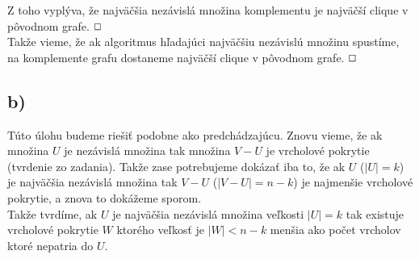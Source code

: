 \documentclass[a4paper]{article}
\begin{document}
Z toho vyplýva, že najväčšia nezávislá množina komplementu je najväčší clique v pôvodnom grafe. $\oblong$
\\

Takže vieme, že ak algoritmus hľadajúci najväčšiu nezávislú množinu spustíme, na komplemente grafu dostaneme najväčší clique v pôvodnom grafe. $\oblong$

\subsection*{b)}

Túto úlohu budeme riešiť podobne ako predchádzajúcu. Znovu vieme, že ak množina $U$ je nezávislá množina tak množina $V-U$ je vrcholové pokrytie (tvrdenie zo zadania). Takže zase potrebujeme dokázať iba to, že ak $U$ ($|U|=k$) je najväčšia nezávislá množina tak $V-U$ ($|V-U|=n-k$) je najmenšie vrcholové pokrytie, a znova to dokážeme sporom.
\\

Takže tvrdíme, ak $U$ je najväčšia nezávislá množina veľkosti $|U|=k$ tak existuje vrcholové pokrytie $W$ ktorého veľkosť je $|W|<n-k$ menšia ako počet vrcholov ktoré nepatria do $U$.
\end{document}
